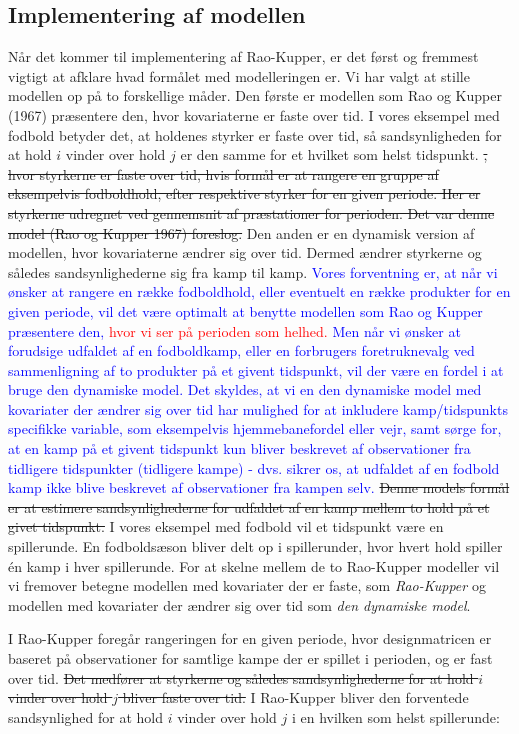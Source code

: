 \documentclass[11pt,a4paper]{article}
\begin{document}
\subsection{Implementering af modellen}
Når det kommer til implementering af Rao-Kupper, er det først og fremmest vigtigt at afklare hvad formålet med modelleringen er. Vi har valgt at stille modellen op på to forskellige måder. Den første er modellen som Rao og Kupper (1967)\cite{RaoKupper} præsentere den, hvor kovariaterne er faste over tid. I vores eksempel med fodbold betyder det, at holdenes styrker er faste over tid, så sandsynligheden for at hold $i$ vinder over hold $j$ er den samme for et hvilket som helst tidspunkt.
\sout{, hvor styrkerne er faste over tid, hvis formål er at rangere en gruppe af eksempelvis fodboldhold, efter respektive styrker for en given periode. Her er styrkerne udregnet ved gennemsnit af præstationer for perioden. Det var denne model (Rao og Kupper 1967) foreslog.} 
Den anden er en dynamisk version af modellen, hvor kovariaterne ændrer sig over tid. Dermed ændrer styrkerne og således sandsynlighederne sig fra kamp til kamp. \textcolor{blue}{Vores forventning er, at når vi ønsker at rangere en række fodboldhold, eller eventuelt en række produkter for en given periode, vil det være optimalt at benytte modellen som Rao og Kupper præsentere den, \textcolor{red}{hvor vi ser på perioden som helhed.} Men når vi ønsker at forudsige udfaldet af en fodboldkamp, eller en forbrugers foretruknevalg ved sammenligning af to produkter på et givent tidspunkt, vil der være en fordel i at bruge den dynamiske model. Det skyldes, at vi en den dynamiske model med kovariater der ændrer sig over tid har mulighed for at inkludere kamp/tidspunkts specifikke variable, som eksempelvis hjemmebanefordel eller vejr, samt sørge for, at en kamp på et givent tidspunkt kun bliver beskrevet af observationer fra tidligere tidspunkter (tidligere kampe) - dvs. sikrer os, at udfaldet af en fodbold kamp ikke blive beskrevet af observationer fra kampen selv.}
\sout{Denne models formål er at estimere sandsynlighederne for udfaldet af en kamp mellem to hold på et givet tidspunkt.} I vores eksempel med fodbold vil et tidspunkt være en spillerunde. En fodboldsæson bliver delt op i spillerunder, hvor hvert hold spiller én kamp i hver spillerunde. For at skelne mellem de to Rao-Kupper modeller vil vi fremover betegne modellen med kovariater der er faste, som \textit{Rao-Kupper} og modellen med kovariater der ændrer sig over tid som \textit{den dynamiske model}.\par 
I Rao-Kupper foregår rangeringen for en given periode, hvor designmatricen er baseret på observationer for samtlige kampe der er spillet i perioden, og er fast over tid. \sout{Det medfører at styrkerne og således sandsynlighederne for at hold $i$ vinder over hold $j$ bliver faste over tid.} I Rao-Kupper bliver den forventede sandsynlighed for at hold $i$ vinder over hold $j$ i en hvilken som helst spillerunde:
\end{document}
